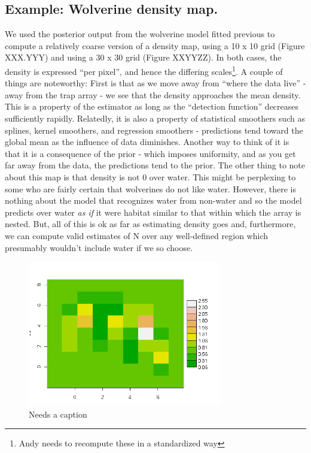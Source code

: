 \subsection{Example: Wolverine density map. } 

We used the posterior output from the wolverine model fitted previous
to compute a relatively coarse version of a density map, using a 10 x
10 grid (Figure XXX.YYY) and using a 30 x 30 grid (Figure XXYYZZ). In
both cases, the density is expressed ``per pixel'', and hence the
differing scales\footnote{Andy needs to recompute these in a
  standardized way}. A couple of things are noteworthy: First is that
as we move away from ``where the data live'' - away from the trap array - we see that the density approaches the mean density. This is a property of the estimator as long as the ``detection function'' decreases sufficiently rapidly. Relatedly, it is also a property of statistical smoothers such as splines, kernel smoothers, and regression smoothers - predictions tend toward the global mean as the influence of data diminishes. Another way to think of it is that it is a consequence of the prior - which imposes uniformity, and as you get far away from the data, the predictions tend to the prior. The other thing to note about this map is that density is not 0 over water. This might be perplexing to some who are fairly certain that wolverines do not like water. However, there is nothing about the model that recognizes water from non-water and so the model predicts over water {\it as if} it were habitat similar to that within which the array is nested. But, all of this is ok as far as estimating density goes and, furthermore, we can compute valid estimates of N over any well-defined region which presumably wouldn't include water if we so choose. 
\begin{figure}
\begin{center}
\includegraphics[height=2.5in]{figs/densitymap1}
\end{center}
\caption{Needs a caption}
\label{fig.densitymap1}
\end{figure}

